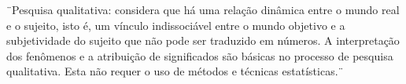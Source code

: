 \begin{fullcite}
    ¨Pesquisa qualitativa: considera que há uma relação dinâmica entre o mundo
real e o sujeito, isto é, um vínculo indissociável entre o mundo objetivo
e a subjetividade do sujeito que não pode ser traduzido em números. A
interpretação dos fenômenos e a atribuição de significados são básicas
no processo de pesquisa qualitativa. Esta não requer o uso de métodos
e técnicas estatísticas.¨\cite[p.~70]{prodanov2013}   
\end{fullcite}


